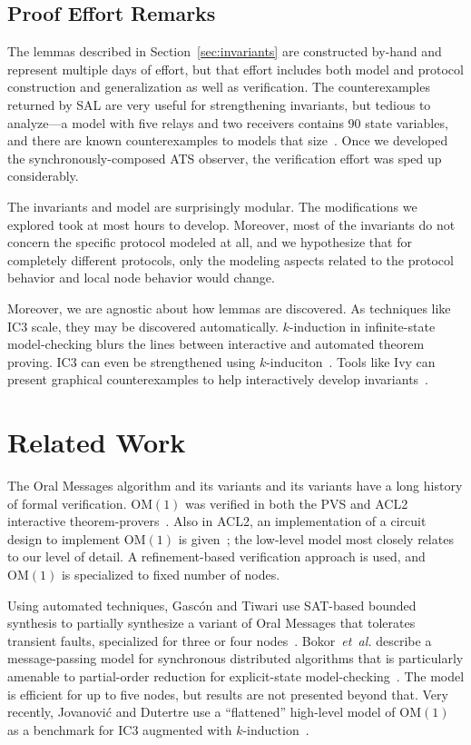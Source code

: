 \documentclass{llncs/llncs}
\newcommand{\OM}[1]{\ensuremath{\mathrm{OM}(#1)}\xspace}
\begin{document}
{\subsection{Proof Effort Remarks}

The lemmas described in Section~\ref{sec:invariants} are constructed by-hand and represent multiple days of effort, but that effort includes both model and protocol construction and generalization as well as verification. The counterexamples returned by SAL are very useful for strengthening invariants, but tedious to analyze---a model with five relays and two receivers contains 90 state variables, and there are known counterexamples to models that size~\cite{Lincoln-Rushby}. Once we developed the synchronously-composed ATS observer, the verification effort was sped up considerably.

The invariants and model are surprisingly modular. The modifications we explored took at most hours to develop. Moreover, most of the invariants do not concern the specific protocol modeled at all, and we hypothesize that for completely different protocols, only the modeling aspects related to the protocol behavior and local node behavior would change.

Moreover, we are agnostic about how lemmas are discovered. As techniques like IC3 scale, they may be discovered automatically. $k$-induction in infinite-state model-checking blurs the lines between interactive and automated theorem proving. IC3 can even be strengthened using $k$-induciton~\cite{pdr-kind}. Tools like Ivy can present graphical counterexamples to help interactively develop invariants~\cite{ivy}.

\section{Related Work}\label{sec:related}

The Oral Messages algorithm and its variants and its variants have a long history of formal verification. \OM{1} was verified in both the PVS and ACL2 interactive theorem-provers~\cite{Young97:IC}. Also in ACL2, an implementation of a circuit design to implement \OM{1} is given~\cite{om-acl2-impl}; the low-level model most closely relates to our level of detail. A refinement-based verification approach is used, and \OM{1} is specialized to fixed number of nodes.

Using automated techniques, Gasc{\'{o}}n and Tiwari use SAT-based bounded synthesis to partially synthesize a variant of Oral Messages that tolerates transient faults, specialized for three or four nodes~\cite{om1-synth}. Bokor~\emph{et~al.} describe a message-passing model for synchronous distributed algorithms that is particularly amenable to partial-order reduction for explicit-state model-checking~\cite{Bokor2010}. The model is efficient for up to five nodes, but results are not presented beyond that. Very recently, Jovanovi{\'{c}} and Dutertre use a ``flattened'' high-level model of \OM{1} as a benchmark for IC3 augmented with $k$-induction~\cite{pdr-kind}.

}
\end{document}
